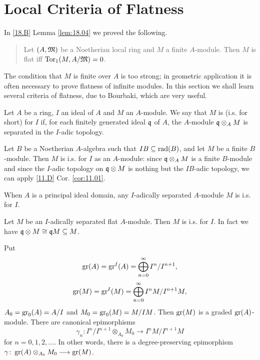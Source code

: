 \documentclass[../main]{subfiles}
\begin{document}
\section{Local Criteria of Flatness}\label{sec:20}
\newparagraph In \ref{18.B} Lemma \ref{lem:18.04} %
we proved the following.

\begin{quote}
    Let $(A,\mathfrak{M})$ be a Noetherian local ring and $M$ a finite $A$-module. Then $M$ is flat iff $\operatorname{Tor}_1(M,A/\mathfrak{M}) = 0$.
\end{quote}
The condition that $M$ is finite over $A$ is too strong; in geometric application it is often necessary to prove flatness of infinite modules. In this section we shall learn several criteria of flatness, due to Bourbaki, which are very useful. 

Let $A$ be a ring, $I$ an ideal of $A$ and $M$ an $A$-module. We say that $M$ is  (i.s. for short) for $I$ if, for each finitely generated ideal $\mathfrak{q}$ of $A$, the $A$-module $\mathfrak{q}\otimes_A M$ is separated in the $I$-adic topology.

\begin{example}
Let $B$ be a Noetherian $A$-algebra such that $IB\subseteq \operatorname{rad}(B)$, and let $M$ be a finite $B$-module. Then $M$ is i.s. for $I$ as an $A$-module: since $\mathfrak{q}\otimes_A M$ is a finite $B$-module and since the $I$-adic topology on $\mathfrak{q}\otimes M$ is nothing but the $IB$-adic topology, we can apply \ref{11.D} %
Cor. \ref{cor:11.01}.
\end{example}

\begin{example}
When $A$ is a principal ideal domain, any $I$-adically separated $A$-module $M$ is i.s. for $I$.
\end{example}

\begin{example}
Let $M$ be an $I$-adically separated flat $A$-module. Then $M$ is i.s. for $I$. In fact we have $\mathfrak{q}\otimes M\cong \mathfrak{q} M\subseteq M$.
\end{example}

\newparagraph Put \[\operatorname{gr}(A) = \operatorname{gr}^I(A) = \bigoplus_{n=0}^\infty I^n/I^{n+1},\] \[\operatorname{gr}(M) = \operatorname{gr}^I(M) = \bigoplus_{n=0}^\infty I^nM/I^{n+1}M,\] $A_0 = \operatorname{gr}_0(A) = A/I$ and $M_0 = \operatorname{gr}_0(M) = M/IM$. Then $\operatorname{gr}(M)$ is a graded $\operatorname{gr}(A)$-module. There are canonical epimorphisms \[\gamma_n\colon I^n/I^{n+1}\otimes_{A_0}M_0\longrightarrow I^nM/I^{n+1}M\] for $n = 0,1,2,\ldots$. In other words, there is a degree-preserving epimorphism $\gamma\colon \operatorname{gr}(A)\otimes_{A_0}M_0\longrightarrow \operatorname{gr}(M)$.
\end{document}
